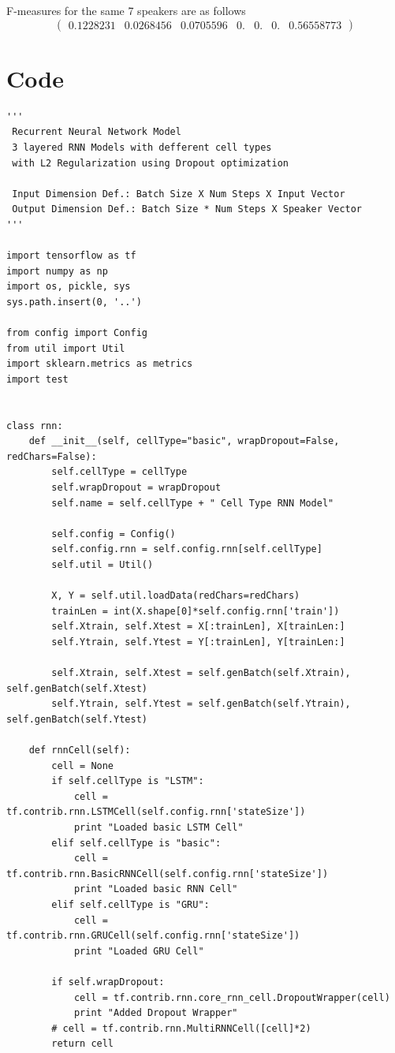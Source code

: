 \documentclass[BTech]{srmuthesis}
\begin{document}
F-measures for the same 7 speakers are as follows
$$\begin{pmatrix}
0.1228231&0.0268456&0.0705596&0.&0.&0.&0.56558773
\end{pmatrix}$$

\section{Code}

\begin{verbatim}
'''
 Recurrent Neural Network Model
 3 layered RNN Models with defferent cell types
 with L2 Regularization using Dropout optimization

 Input Dimension Def.: Batch Size X Num Steps X Input Vector
 Output Dimension Def.: Batch Size * Num Steps X Speaker Vector
'''

import tensorflow as tf
import numpy as np
import os, pickle, sys
sys.path.insert(0, '..')

from config import Config
from util import Util
import sklearn.metrics as metrics
import test


class rnn:
    def __init__(self, cellType="basic", wrapDropout=False, redChars=False):
        self.cellType = cellType
        self.wrapDropout = wrapDropout
        self.name = self.cellType + " Cell Type RNN Model"

        self.config = Config()
        self.config.rnn = self.config.rnn[self.cellType]
        self.util = Util()

        X, Y = self.util.loadData(redChars=redChars)
        trainLen = int(X.shape[0]*self.config.rnn['train'])
        self.Xtrain, self.Xtest = X[:trainLen], X[trainLen:]
        self.Ytrain, self.Ytest = Y[:trainLen], Y[trainLen:]

        self.Xtrain, self.Xtest = self.genBatch(self.Xtrain), self.genBatch(self.Xtest)
        self.Ytrain, self.Ytest = self.genBatch(self.Ytrain), self.genBatch(self.Ytest)

    def rnnCell(self):
        cell = None
        if self.cellType is "LSTM":
            cell = tf.contrib.rnn.LSTMCell(self.config.rnn['stateSize'])
            print "Loaded basic LSTM Cell"
        elif self.cellType is "basic":
            cell = tf.contrib.rnn.BasicRNNCell(self.config.rnn['stateSize'])
            print "Loaded basic RNN Cell"
        elif self.cellType is "GRU":
            cell = tf.contrib.rnn.GRUCell(self.config.rnn['stateSize'])
            print "Loaded GRU Cell"

        if self.wrapDropout:
            cell = tf.contrib.rnn.core_rnn_cell.DropoutWrapper(cell)
            print "Added Dropout Wrapper"
        # cell = tf.contrib.rnn.MultiRNNCell([cell]*2)
        return cell


\end{verbatim}
\end{document}
